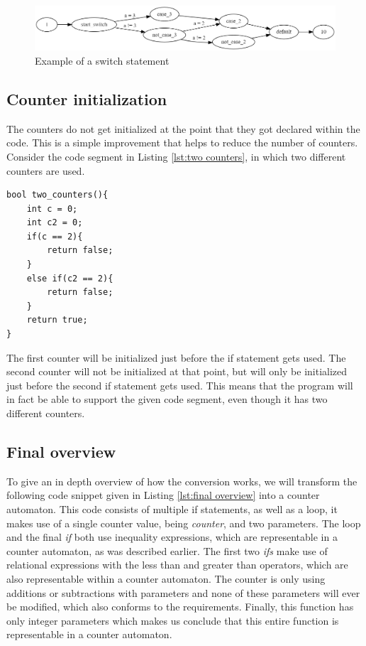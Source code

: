 \documentclass[12pt]{thesis}
\begin{document}
\begin{figure}[h]
	\centering
	\includegraphics[width=\linewidth]{counter_switch}
	\caption{Example of a switch statement}
	\label{fig:counter_switch}
\end{figure}

\subsection{Counter initialization}
The counters do not get initialized at the point that they got declared within the code. This is a simple improvement that helps to reduce the number of counters. Consider the code segment in Listing \ref{lst:two counters}, in which two different counters are used.

\begin{lstlisting}[style=CStyle, caption={Example of a function with two non-overlapping counters}, label={lst:two counters}]
bool two_counters(){
	int c = 0;
	int c2 = 0;
	if(c == 2){
		return false;
	}
	else if(c2 == 2){
		return false;
	}
	return true;
}
\end{lstlisting}
The first counter will be initialized just before the if statement gets used. The second counter will not be initialized at that point, but will only be initialized just before the second if statement gets used. This means that the program will in fact be able to support the given code segment, even though it has two different counters.

\subsection{Final overview}
To give an in depth overview of how the conversion works, we will transform the following code snippet given in Listing \ref{lst:final overview} into a counter automaton. This code consists of multiple if statements, as well as a loop, it makes use of a single counter value, being \textit{counter}, and two parameters. The loop and the final \textit{if} both use inequality expressions, which are representable in a counter automaton, as was described earlier. The first two \textit{ifs} make use of relational expressions with the less than and greater than operators, which are also representable within a counter automaton. The counter is only  using additions or subtractions with parameters and none of these parameters will ever be modified, which also conforms to the requirements. Finally, this function has only integer parameters which makes us conclude that this entire function is representable in a counter automaton.
\end{document}
